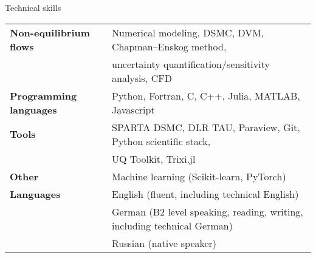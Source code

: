 \documentclass{resume} %
\begin{document}

\begin{rSection}{Technical skills}

\begin{tabular}{ @{} >{\bfseries}l @{\hspace{1ex}} l }
Non-equilibrium flows \ & Numerical modeling, DSMC, DVM, Chapman--Enskog method, \\
\ & uncertainty quantification/sensitivity analysis, CFD \\
Programming languages \ & Python, Fortran, C, C++, Julia, MATLAB, Javascript \\
Tools \ & SPARTA DSMC, DLR TAU, Paraview, Git, Python scientific stack, \\
\ & UQ Toolkit, Trixi.jl \\
Other \ & Machine learning (Scikit-learn, PyTorch) \\ 
Languages \ & English (fluent, including technical English) \\
\ & German (B2 level speaking, reading, writing, including technical German) \\
\ & Russian (native speaker)
\end{tabular}

\end{rSection}
\end{document}
